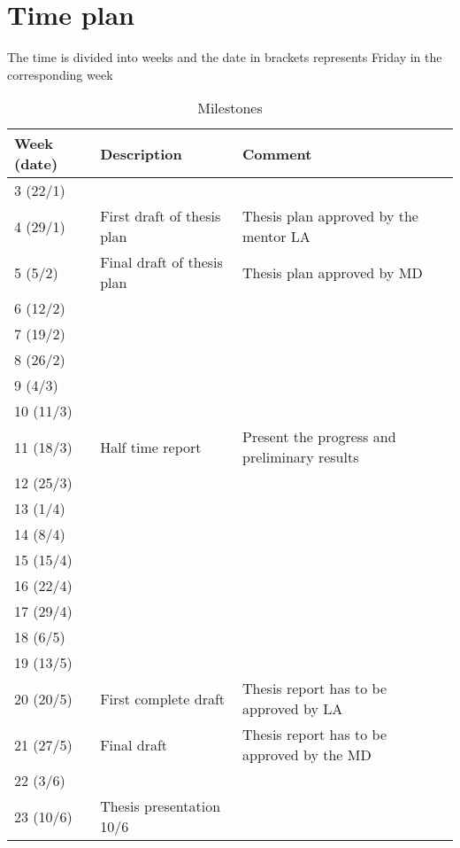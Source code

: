 \newpage

\section{Time plan}
The time is divided into weeks and the date in brackets represents Friday in the corresponding week 

\begin{table}[H]
\caption{Milestones}
\begin{tabular}{|l|p{}|p{6cm}|}
	\hline
	\textbf{Week (date)} & \textbf{Description}       & \textbf{Comment}                             \\ \hline
	3 (22/1)             &                            &  \\ \hline
	4 (29/1)             & First draft of thesis plan & Thesis plan approved by the mentor LA        \\ \hline
	5 (5/2)              & Final draft of thesis plan & Thesis plan approved by MD                   \\ \hline
	6 (12/2)             &                            &  \\ \hline
	7 (19/2)             &                            &  \\ \hline
	8 (26/2)             &                            &  \\ \hline
	9 (4/3)              &                            &  \\ \hline
	10 (11/3)            &                            &  \\ \hline
	11 (18/3)            & Half time report           & Present the progress and preliminary results \\ \hline
	12 (25/3)            &                            &  \\ \hline
	13 (1/4)             &                            &  \\ \hline
	14 (8/4)             &                            &  \\ \hline
	15 (15/4)            &                            &  \\ \hline
	16 (22/4)            &                            &  \\ \hline
	17 (29/4)            &                            &  \\ \hline
	18 (6/5)             &                            &  \\ \hline
	19 (13/5)            &                            &  \\ \hline
	20 (20/5)            & First complete draft       & Thesis report has to be approved by LA       \\ \hline
	21 (27/5)            & Final draft                & Thesis report has to be approved by the MD   \\ \hline
	22 (3/6)             &                            &  \\ \hline
	23 (10/6)            & Thesis presentation 10/6   &  \\ \hline
\end{tabular}
\end{table}